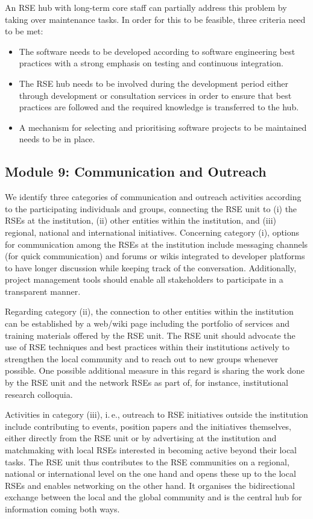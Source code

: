 \documentclass[10pt,letterpaper]{article}
\newcommand*{\ie}{i.\,e.,\xspace}
\begin{document}
An RSE hub with long-term core staff can partially address this problem by taking over maintenance tasks.
In order for this to be feasible, three criteria need to be met:

\begin{itemize}
\item The software needs to be developed according to software engineering best practices with a strong emphasis on testing and continuous integration.
\item The RSE hub needs to be involved during the development period either through development or consultation services in order to ensure that best practices are followed and the required knowledge is transferred to the hub.
\item A mechanism for selecting and prioritising software projects to be maintained needs to be in place.
\end{itemize}

\subsection*{Module 9: Communication and Outreach}%
\label{sec:outreach}

We identify three categories of communication and outreach activities according to the participating individuals and groups, connecting the RSE unit to (i) the RSEs at the institution, (ii) other entities within the institution, and (iii) regional, national and international initiatives.
Concerning category (i), options for communication among the RSEs at the institution include messaging channels (for quick communication) and forums or wikis integrated to developer platforms to have longer discussion while keeping track of the conversation.
Additionally, project management tools should enable all stakeholders to participate in a transparent manner.

Regarding category (ii), the connection to other entities within the institution can be established by a web/wiki page including the portfolio of services and training materials offered by the RSE unit.
The RSE unit should advocate the use of RSE techniques and best practices within their institutions actively to strengthen the local community and to reach out to new groups whenever possible.
One possible additional measure in this regard is sharing the work done by the RSE unit and the network RSEs as part of, for instance, institutional research colloquia.

Activities in category (iii), \ie{} outreach to RSE initiatives outside the institution include contributing to events, position papers and the initiatives themselves, either directly from the RSE unit or by advertising at the institution and matchmaking with local RSEs interested in becoming active beyond their local tasks.
The RSE unit thus contributes to the RSE communities on a regional, national or international level on the one hand and opens these up to the local RSEs and enables networking on the other hand.
It organises the bidirectional exchange between the local and the global community and is the central hub for information coming both ways.
\end{document}
